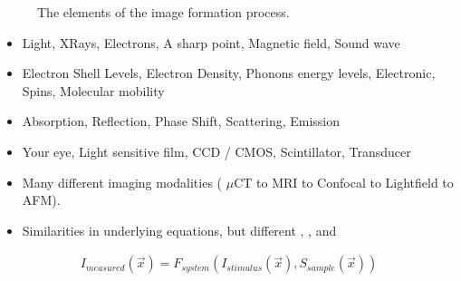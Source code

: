 \documentclass[letterpaper,10pt,english]{sphinxmanual}
\begin{document}
\begin{figure}[htbp]
\centering
\capstart

\noindent{}
\caption{The elements of the image formation process.}\label{\detokenize{04-BasicSegmentation:id4}}\end{figure}
\begin{itemize}
\item {} 
\sphinxAtStartPar
{} Light, X\sphinxhyphen{}Rays, Electrons, A sharp point, Magnetic field, Sound wave

\item {} 
\sphinxAtStartPar
{} Electron Shell Levels, Electron Density, Phonons energy levels, Electronic, Spins, Molecular mobility

\item {} 
\sphinxAtStartPar
{} Absorption, Reflection, Phase Shift, Scattering, Emission

\item {} 
\sphinxAtStartPar
{} Your eye, Light sensitive film, CCD / CMOS, Scintillator, Transducer

\end{itemize}


\begin{itemize}
\item {} 
\sphinxAtStartPar
Many different imaging modalities ( \(\mu \textrm{CT}\) to MRI to Confocal to Light\sphinxhyphen{}field to AFM).

\item {} 
\sphinxAtStartPar
Similarities in underlying equations, but different , , and 

\end{itemize}
\begin{equation*}
\begin{split}I_{measured}(\vec{x})=F_{system}(I_{stimulus}(\vec{x}),S_{sample}(\vec{x}))\end{split}
\end{equation*}
\end{document}
